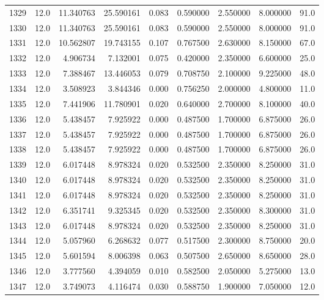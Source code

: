 \begin{tabular}{lrrrrrrrr}
1329 &   12.0 &  11.340763 &  25.590161 &  0.083 &  0.590000 &  2.550000 &   8.000000 &   91.0 \\
1330 &   12.0 &  11.340763 &  25.590161 &  0.083 &  0.590000 &  2.550000 &   8.000000 &   91.0 \\
1331 &   12.0 &  10.562807 &  19.743155 &  0.107 &  0.767500 &  2.630000 &   8.150000 &   67.0 \\
1332 &   12.0 &   4.906734 &   7.132001 &  0.075 &  0.420000 &  2.350000 &   6.600000 &   25.0 \\
1333 &   12.0 &   7.388467 &  13.446053 &  0.079 &  0.708750 &  2.100000 &   9.225000 &   48.0 \\
1334 &   12.0 &   3.508923 &   3.844346 &  0.000 &  0.756250 &  2.000000 &   4.800000 &   11.0 \\
1335 &   12.0 &   7.441906 &  11.780901 &  0.020 &  0.640000 &  2.700000 &   8.100000 &   40.0 \\
1336 &   12.0 &   5.438457 &   7.925922 &  0.000 &  0.487500 &  1.700000 &   6.875000 &   26.0 \\
1337 &   12.0 &   5.438457 &   7.925922 &  0.000 &  0.487500 &  1.700000 &   6.875000 &   26.0 \\
1338 &   12.0 &   5.438457 &   7.925922 &  0.000 &  0.487500 &  1.700000 &   6.875000 &   26.0 \\
1339 &   12.0 &   6.017448 &   8.978324 &  0.020 &  0.532500 &  2.350000 &   8.250000 &   31.0 \\
1340 &   12.0 &   6.017448 &   8.978324 &  0.020 &  0.532500 &  2.350000 &   8.250000 &   31.0 \\
1341 &   12.0 &   6.017448 &   8.978324 &  0.020 &  0.532500 &  2.350000 &   8.250000 &   31.0 \\
1342 &   12.0 &   6.351741 &   9.325345 &  0.020 &  0.532500 &  2.350000 &   8.300000 &   31.0 \\
1343 &   12.0 &   6.017448 &   8.978324 &  0.020 &  0.532500 &  2.350000 &   8.250000 &   31.0 \\
1344 &   12.0 &   5.057960 &   6.268632 &  0.077 &  0.517500 &  2.300000 &   8.750000 &   20.0 \\
1345 &   12.0 &   5.601594 &   8.006398 &  0.063 &  0.507500 &  2.650000 &   8.650000 &   28.0 \\
1346 &   12.0 &   3.777560 &   4.394059 &  0.010 &  0.582500 &  2.050000 &   5.275000 &   13.0 \\
1347 &   12.0 &   3.749073 &   4.116474 &  0.030 &  0.588750 &  1.900000 &   7.050000 &   12.0 \\

\end{tabular}
